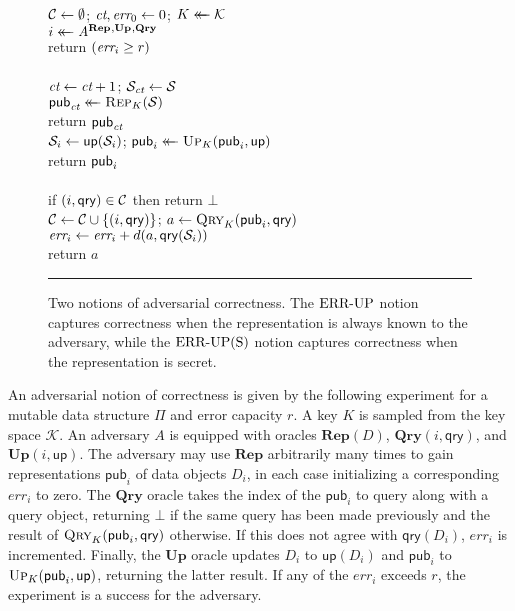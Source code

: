 
\begin{figure}[t]
  {
    \\[2pt]
      $\mathcal{C} \gets \emptyset$; $\textit{ct},\textit{err}_0 \gets 0$;
      $K \mathrel{\leftarrow\mkern-14mu\leftarrow} \mathcal{K}$\\
      $i \mathrel{\leftarrow\mkern-14mu\leftarrow} \mathit{A}^{\mathbf{Rep}\hspace{0.5pt},\mathbf{Up}\hspace{0.5pt},\mathbf{Qry}\hspace{0.5pt}}$\\
      return $(\textit{err}_i \geq r)$ 
    \\[6pt]
    \oraclev{$\REPO(\col)$}\\[2pt]
      $\textit{ct}\gets\textit{ct}+1$;
      $\mathcal{S}_{\textit{ct}} \gets \mathcal{S}$\\
      $\mathsf{pub}_{\textit{ct}} \mathrel{\leftarrow\mkern-14mu\leftarrow} \textsc{Rep}_K(\mathcal{S})$\\
      return $\mathsf{pub}_{\textit{ct}}$ 
  }
  {
    \\[2pt]
      $\mathcal{S}_i \gets \mathsf{up}(\mathcal{S}_i)$;
      $\mathsf{pub}_i \mathrel{\leftarrow\mkern-14mu\leftarrow} \textsc{Up}_K(\mathsf{pub}_i, \mathsf{up})$\\
      return $\mathsf{pub}_i$ 
    \\[9pt]
    \\[2pt]
      if $(i,\mathsf{qry}) \in \mathcal{C}$ then return $\bot$\\
      $\mathcal{C} \gets \mathcal{C} \cup \{(i,\mathsf{qry})\}$; $a \gets \textsc{Qry}_K(\mathsf{pub}_i, \mathsf{qry})$\\
      $\textit{err}_i \gets \textit{err}_i + d(a,\mathsf{qry}(\mathcal{S}_i))$\\
      return $a$
  }
  \caption{Two notions of adversarial correctness. The $\textnormal{ERR\mbox{-}UP}$ notion captures correctness when the representation is always known to the adversary, while the $\textnormal{ERR\mbox{-}UP(S)}$ notion captures correctness when the representation is secret.}
  \vspace{6pt}\hrule
  \label{fig:security}
\end{figure}

An adversarial notion of correctness is given by the following experiment for a mutable data structure $\Pi$ and error capacity $r$. A key $K$ is sampled from the key space $\mathcal{K}$. An adversary $A$ is equipped with oracles $\mathbf{Rep}(D)$, $\mathbf{Qry}(i,\mathsf{qry})$, and $\mathbf{Up}(i,\mathsf{up})$. The adversary may use $\mathbf{Rep}$ arbitrarily many times to gain representations $\mathsf{pub}_i$ of data objects $D_i$, in each case initializing a corresponding $err_i$ to zero. The $\mathbf{Qry}$ oracle takes the index of the $\mathsf{pub}_i$ to query along with a query object, returning $\bot$ if the same query has been made previously and the result of $\textsc{Qry}_K(\mathsf{pub}_i,\mathsf{qry})$ otherwise. If this does not agree with $\mathsf{qry}(D_i)$, $err_i$ is incremented. Finally, the $\mathbf{Up}$ oracle updates $D_i$ to $\mathsf{up}(D_i)$ and $\mathsf{pub}_i$ to $\textsc{Up}_K(\mathsf{pub}_i,\mathsf{up})$, returning the latter result. If any of the $err_i$ exceeds $r$, the experiment is a success for the adversary.

